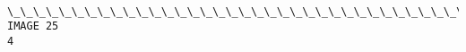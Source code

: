 \documentclass[11pt]{article}
\begin{document}
    \begin{center}
    \end{center}
    { \hspace*{\fill} \\}
    
    \begin{Verbatim}[commandchars=\\\{\}]
\_\_\_\_\_\_\_\_\_\_\_\_\_\_\_\_\_\_\_\_\_\_\_\_\_\_\_\_\_\_\_\_\_\_\_\_\_\_\_\_\_\_\_\_\_\_\_\_\_\_\_\_\_\_\_\_\_\_\_\_
IMAGE 25
4

    \end{Verbatim}

    \begin{center}
    \end{center}
    { \hspace*{\fill} \\}
    

    
    
    
    
\end{document}
